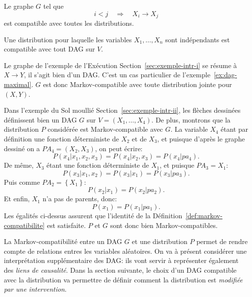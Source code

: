\begin{example}
  \label{ex:dag-maximal}
Le graphe $G$ tel que
\[ i<j\quad \Longrightarrow \quad X_i\to X_j \]
est compatible avec toutes les distributions.
\begin{center}
\end{center}
\end{example}

\begin{example}
Une distribution pour laquelle les variables $X_1,\dots,X_n$ sont indépendants est compatible avec tout DAG sur $V$.
\end{example}

\begin{example}[Exécution]
  \label{ex:dag-execution}
Le graphe de l'exemple de l'Exécution Section~\ref{sec:exemple-intr-i} se résume à $X\to Y$, il s'agit bien d'un DAG. C'est un cas particulier de l'exemple~\ref{ex:dag-maximal}. $G$ est donc Markov-compatible avec toute distribution jointe pour $(X,Y)$. 
\end{example}

\begin{example}
Dans l'exemple du Sol moullié Section~\ref{sec:exemple-intr-ii}, les flèches dessinées définissent bien un DAG $G$ sur $V=(X_1,\dots,X_4)$. De plus, montrons que la distribution $P$ considérée est Markov-compatible avec $G$.
La variable $X_4$ étant par définition une fonction déterministe de
$X_2$ et de $X_3$, et puisque d'après le graphe dessiné on a
$PA_4=(X_2,X_3)$, on peut écrire:
\[ P(x_4|x_1,x_2,x_3)=P(x_4|x_2,x_3)=P(x_4|pa_4). \]
De même, $X_3$ étant une fonction déterministe de $X_1$, et puisque $PA_3=X_1$:
\[ P(x_3|x_1,x_2)=P(x_3|x_1)=P(x_3|pa_3). \]
Puis comme $PA_2=\left\{ X_1 \right\}$:
\[ P(x_2|x_1)=P(x_2|pa_2). \]
Et enfin, $X_1$ n'a pas de parents, donc:
\[ P(x_1)=P(x_1|pa_1). \] Les égalités ci-dessus assurent que
l'identité de la Définition~\ref{def:markov-compatibilite} est
satisfaite.  $P$ et $G$ sont donc bien Markov-compatibles.
\end{example}

La Markov-compatibilité entre un DAG $G$ et une distribution $P$
permet de rendre compte de relations entres les variables aléatoires.
On va à présent considérer une interprétation supplémentaire des DAG:
ils vont servir à représenter également des \emph{liens de
  causalité}. Dans la section suivante, le choix d'un DAG compatible
avec la distribution va permettre de définir comment la distribution
est \emph{modifiée par une intervention}.

